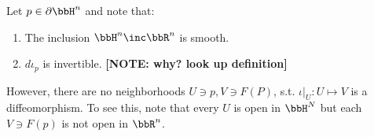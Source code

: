Let $p \in \partial \bbH^n$ and note that:

\begin{enumerate}[1.]
\item The inclusion $\bbH^n \inc \bbR^n$ is smooth.
\item $d \iota_p$ is invertible. \textbf{[NOTE: why? look up definition]}
\end{enumerate}

However, there are no neighborhoods $U \ni p, V \ni F(P)$, s.t. $\iota|_U:U\mapsto V$ is a diffeomorphism.  To see this, note that every $U$ is open in $\bbH^N$ but each $V \ni F(p)$ is not open in $\bbR^n$.